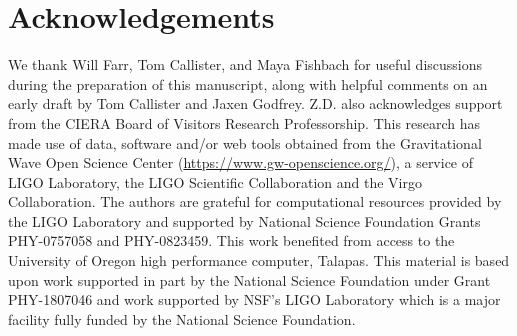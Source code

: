\documentclass[twocolumn, linenumbers]{aastex631}
\begin{document}





\section{Acknowledgements}\label{sec:acknowledments}
We thank Will Farr, Tom Callister, and Maya Fishbach for useful discussions during the preparation of this manuscript, 
along with helpful comments on an early draft by Tom Callister and Jaxen Godfrey. Z.D. also acknowledges support from the CIERA Board
of Visitors Research Professorship. This research has made use of data, software and/or web tools obtained from the Gravitational Wave Open Science Center 
(\url{https://www.gw-openscience.org/}), a service of LIGO Laboratory, the LIGO Scientific Collaboration and the Virgo Collaboration. 
The authors are grateful for computational resources provided by the LIGO Laboratory and supported by National Science Foundation Grants PHY-0757058 and PHY-0823459.  
This work benefited from access to the University of Oregon high performance computer, Talapas. This material is based upon work supported 
in part by the National Science Foundation under Grant PHY-1807046 and work supported by NSF's LIGO Laboratory which is a major facility 
fully funded by the National Science Foundation.
{}



\end{document}
